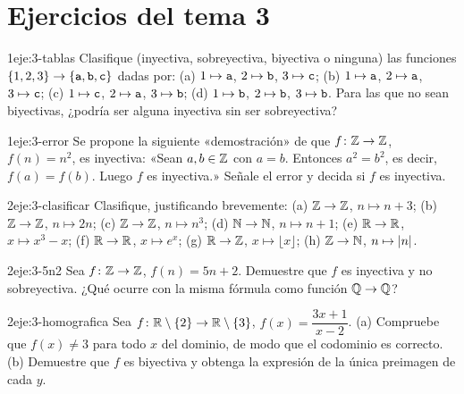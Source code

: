 \section*{Ejercicios del tema 3}

\begin{ejercicio}{1}{eje:3-tablas}
Clasifique (inyectiva, sobreyectiva, biyectiva o ninguna) las funciones $\{1,2,3\}\to\{\texttt{a},\texttt{b},\texttt{c}\}$ dadas por: (a) $1\mapsto\texttt{a}$, $2\mapsto\texttt{b}$, $3\mapsto\texttt{c}$; (b) $1\mapsto\texttt{a}$, $2\mapsto\texttt{a}$, $3\mapsto\texttt{c}$; (c) $1\mapsto\texttt{c}$, $2\mapsto\texttt{a}$, $3\mapsto\texttt{b}$; (d) $1\mapsto\texttt{b}$, $2\mapsto\texttt{b}$, $3\mapsto\texttt{b}$. Para las que no sean biyectivas, ¿podría ser alguna inyectiva sin ser sobreyectiva?
\end{ejercicio}

\begin{ejercicio}{1}{eje:3-error}
Se propone la siguiente «demostración» de que $f\colon\mathbb{Z}\to\mathbb{Z}$, $f(n)=n^{2}$, es inyectiva: «Sean $a,b\in\mathbb{Z}$ con $a=b$. Entonces $a^{2}=b^{2}$, es decir, $f(a)=f(b)$. Luego $f$ es inyectiva.» Señale el error y decida si $f$ es inyectiva.
\end{ejercicio}

\begin{ejercicio}{2}{eje:3-clasificar}
Clasifique, justificando brevemente: (a) $\mathbb{Z}\to\mathbb{Z}$, $n\mapsto n+3$; (b) $\mathbb{Z}\to\mathbb{Z}$, $n\mapsto 2n$; (c) $\mathbb{Z}\to\mathbb{Z}$, $n\mapsto n^{3}$; (d) $\mathbb{N}\to\mathbb{N}$, $n\mapsto n+1$; (e) $\mathbb{R}\to\mathbb{R}$, $x\mapsto x^{3}-x$; (f) $\mathbb{R}\to\mathbb{R}$, $x\mapsto e^{x}$; (g) $\mathbb{R}\to\mathbb{Z}$, $x\mapsto\lfloor x\rfloor$; (h) $\mathbb{Z}\to\mathbb{N}$, $n\mapsto\lvert n\rvert$.
\end{ejercicio}

\begin{ejercicio}{2}{eje:3-5n2}
Sea $f\colon\mathbb{Z}\to\mathbb{Z}$, $f(n)=5n+2$. Demuestre que $f$ es inyectiva y no sobreyectiva. ¿Qué ocurre con la misma fórmula como función $\mathbb{Q}\to\mathbb{Q}$?
\end{ejercicio}

\begin{ejercicio}{2}{eje:3-homografica}
Sea $f\colon\mathbb{R}\setminus\{2\}\to\mathbb{R}\setminus\{3\}$, $f(x)=\dfrac{3x+1}{x-2}$. (a) Compruebe que $f(x)\neq3$ para todo $x$ del dominio, de modo que el codominio es correcto. (b) Demuestre que $f$ es biyectiva y obtenga la expresión de la única preimagen de cada $y$.
\end{ejercicio}

